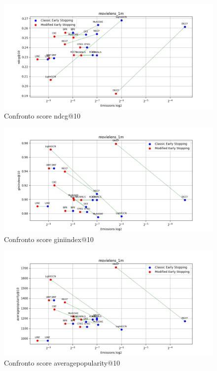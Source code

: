 \begin{figure}[H]
    \centering
    \includegraphics[width=\linewidth, trim=0 0 0 0]{images/ndcg@10_movielens_1m_30_7_comparison.png}
    \caption{Confronto score ndcg@10}
    
\end{figure}

\begin{figure}[H]
    \centering
    \includegraphics[width=\linewidth, trim=0 0 0 0]{images/giniindex@10_movielens_1m_30_7_comparison.png}
    \caption{Confronto score giniindex@10}
\end{figure}

\begin{figure}[H]
    \centering
    \includegraphics[width=\linewidth, trim=0 0 0 0]{images/averagepopularity@10_movielens_1m_30_7_comparison.png}
    \caption{Confronto score averagepopularity@10}
\end{figure}



